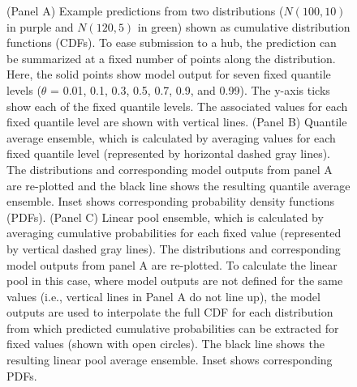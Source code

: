 \documentclass[
]{article}
\begin{document}
\begin{figure}


\caption{\label{fig-example-quantile-average-and-linear-pool}(Panel A)
Example predictions from two distributions (\(N(100, 10)\) in purple and
\(N(120, 5)\) in green) shown as cumulative distribution functions
(CDFs). To ease submission to a hub, the prediction can be summarized at
a fixed number of points along the distribution. Here, the solid points
show model output for seven fixed quantile levels (\(\theta\) = 0.01,
0.1, 0.3, 0.5, 0.7, 0.9, and 0.99). The y-axis ticks show each of the
fixed quantile levels. The associated values for each fixed quantile
level are shown with vertical lines. (Panel B) Quantile average
ensemble, which is calculated by averaging values for each fixed
quantile level (represented by horizontal dashed gray lines). The
distributions and corresponding model outputs from panel A are
re-plotted and the black line shows the resulting quantile average
ensemble. Inset shows corresponding probability density functions
(PDFs). (Panel C) Linear pool ensemble, which is calculated by averaging
cumulative probabilities for each fixed value (represented by vertical
dashed gray lines). The distributions and corresponding model outputs
from panel A are re-plotted. To calculate the linear pool in this case,
where model outputs are not defined for the same values (i.e., vertical
lines in Panel A do not line up), the model outputs are used to
interpolate the full CDF for each distribution from which predicted
cumulative probabilities can be extracted for fixed values (shown with
open circles). The black line shows the resulting linear pool average
ensemble. Inset shows corresponding PDFs.}

\end{figure}%
\end{document}
